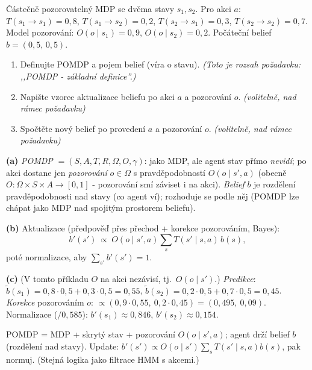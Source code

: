 \begin{zadani}
Částečně pozorovatelný MDP se dvěma stavy $s_1,s_2$. Pro akci $a$: $T(s_1\!\to\!s_1)=0{,}8$, $T(s_1\!\to\!s_2)=0{,}2$, $T(s_2\!\to\!s_1)=0{,}3$, $T(s_2\!\to\!s_2)=0{,}7$. Model pozorování: $O(o\mid s_1)=0{,}9$, $O(o\mid s_2)=0{,}2$. Počáteční belief $b=(0{,}5,\,0{,}5)$.
\begin{enumerate}[label=(\alph*)]
  \item {} Definujte POMDP a pojem belief (víra o stavu). \emph{(Toto je rozsah požadavku: ,,POMDP - základní definice''.)}
  \item Napište vzorec aktualizace beliefu po akci $a$ a pozorování $o$. \emph{(volitelně, nad rámec požadavku)}
  \item Spočtěte nový belief po provedení $a$ a pozorování $o$. \emph{(volitelně, nad rámec požadavku)}
\end{enumerate}
\end{zadani}

\begin{reseni}
\textbf{(a)} \emph{POMDP} $=(S,A,T,R,\Omega,O,\gamma)$: jako MDP, ale agent stav přímo \emph{nevidí}; po akci dostane jen \emph{pozorování} $o\in\Omega$ s pravděpodobností $O(o\mid s',a)$ (obecně $O:\Omega\times S\times A\to[0,1]$ - pozorování smí záviset i na akci). \emph{Belief} $b$ je rozdělení pravděpodobnosti nad stavy (co agent ví); rozhoduje se podle něj (POMDP lze chápat jako MDP nad spojitým prostorem beliefu).

\textbf{(b)} Aktualizace (předpověď přes přechod + korekce pozorováním, Bayes):
\[
b'(s')\ \propto\ O(o\mid s',a)\sum_{s} T(s'\mid s,a)\,b(s),
\]
poté normalizace, aby $\sum_{s'}b'(s')=1$.

\textbf{(c)} (V tomto příkladu $O$ na akci nezávisí, tj.\ $O(o\mid s')$.) \emph{Predikce}: $\tilde b(s_1)=0{,}8\cdot0{,}5+0{,}3\cdot0{,}5=0{,}55$, $\tilde b(s_2)=0{,}2\cdot0{,}5+0{,}7\cdot0{,}5=0{,}45$.
\emph{Korekce} pozorováním $o$: $\propto(0{,}9\cdot0{,}55,\ 0{,}2\cdot0{,}45)=(0{,}495,\ 0{,}09)$. Normalizace ($/0{,}585$): $b'(s_1)\approx0{,}846$, $b'(s_2)\approx0{,}154$.
\end{reseni}

\begin{jadro}
POMDP = MDP + skrytý stav + pozorování $O(o\mid s',a)$; agent drží belief $b$ (rozdělení nad stavy). Update: $b'(s')\propto O(o\mid s')\sum_s T(s'\mid s,a)b(s)$, pak normuj. (Stejná logika jako filtrace HMM s akcemi.)
\end{jadro}

